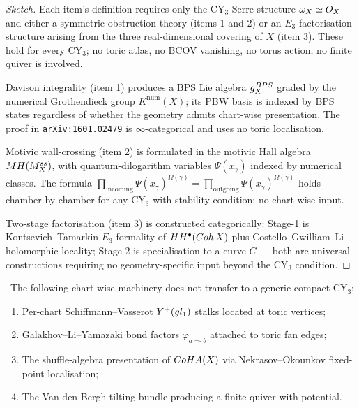 \begin{proof}[Sketch]
Each item's definition requires only the CY$_3$ Serre structure
$\omega_X \simeq O_X$ and either a symmetric obstruction theory (items
1 and 2) or an $E_3$-factorisation structure arising from the three
real-dimensional covering of $X$ (item 3). These hold for every CY$_3$;
no toric atlas, no BCOV vanishing, no torus action, no finite quiver
is involved.

Davison integrality (item 1) produces a BPS Lie algebra $g_X^{BPS}$
graded by the numerical Grothendieck group $K^{\mathrm{num}}(X)$; its
PBW basis is indexed by BPS states regardless of whether the geometry
admits chart-wise presentation. The proof in
\texttt{arXiv:1601.02479} is $\infty$-categorical and uses no toric
localisation.

Motivic wall-crossing (item 2) is formulated in the motivic Hall
algebra $MH(M_X^{ss})$, with quantum-dilogarithm variables
$\Psi(x_\gamma)$ indexed by numerical classes. The formula
$\prod_{\mathrm{incoming}} \Psi(x_\gamma)^{\Omega(\gamma)} =
\prod_{\mathrm{outgoing}} \Psi(x_\gamma)^{\Omega(\gamma)}$ holds
chamber-by-chamber for any CY$_3$ with stability condition; no
chart-wise input.

Two-stage factorisation (item 3) is constructed categorically: Stage-1
is Kontsevich--Tamarkin $E_3$-formality of $HH^\bullet(Coh\,X)$ plus
Costello--Gwilliam--Li holomorphic locality; Stage-2 is specialisation to
a curve $C$ --- both are universal constructions requiring no
geometry-specific input beyond the CY$_3$ condition.
\end{proof}

\begin{proposition}
\label{prop:transfer-failures}
\ClaimStatusProposition\
The following chart-wise machinery does not transfer to a generic
compact CY$_3$:
\begin{enumerate}[leftmargin=2em]
\item Per-chart Schiffmann--Vasserot $Y^+(gl_1)$ stalks
  located at toric vertices;
\item Galakhov--Li--Yamazaki bond factors $\varphi_{a \Rightarrow b}$
  attached to toric fan edges;
\item The shuffle-algebra presentation of $CoHA(X)$ via
  Nekrasov--Okounkov fixed-point localisation;
\item The Van den Bergh tilting bundle producing a finite quiver with
  potential.
\end{enumerate}
\end{proposition}

